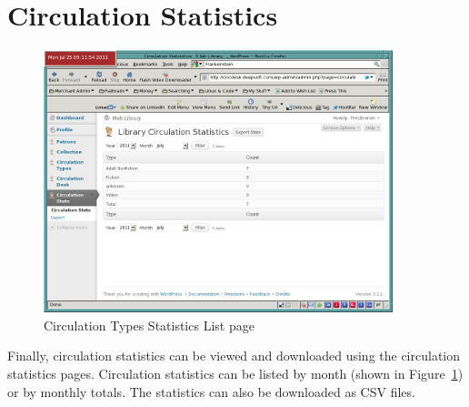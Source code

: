 \documentclass[letterpaper,twoside]{article}
\begin{document}
\section{Circulation Statistics}

\begin{figure}[htbp]
\begin{centering}
\includegraphics[width=4in]{CirculationTypesStatsList.png}
\caption{Circulation Types Statistics List page}
\label{fig:CirculationTypesStatsList}
\end{centering}
\end{figure}
Finally, circulation statistics can be viewed and downloaded using the
circulation statistics pages. Circulation statistics can be listed by
month (shown in Figure~\ref{fig:CirculationTypesStatsList}) or by
monthly totals.  The statistics can also be downloaded as CSV files.
\end{document}
